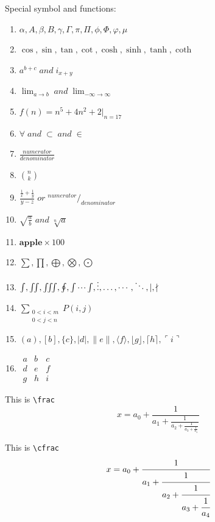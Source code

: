 \documentclass[12pt, a4paper, twoside]{report}
\begin{document}
Special symbol and functions:\\
\begin{enumerate}
    \item $\alpha, A, \beta, B, \gamma, \Gamma, \pi, \Pi, \phi, \Phi, \varphi, \mu$
    \item $\cos, \sin, \tan, \cot, \cosh, \sinh, \tanh, \coth$
    \item $a^{b+c} \; and \; i_{x+y} $
    \item $\lim_{a \to b} \; and \; \lim_{-\infty \to \infty}$
    \item $f(n) = n^5 + 4n^2 + 2|_{n=17}$
    \item $\forall \; and \; \subset \; and \; \in $
    \item $\frac{numerator}{denominator}$
    \item $\binom{n}{k}$
    \item $\frac{\frac{1}{x}+\frac{1}{y}}{y-z} \; or \; ^{numerator}/_{denominator}$
    \item $\sqrt{\frac{a}{b}} \;and \; \sqrt[n]{a}$
    \item $ \textbf{apple} \times 100 $
    \item $ \sum, \prod, \bigoplus, \bigotimes, \bigodot $
    \item $ \int, \iint ,\iiint, \oint, \idotsint, \vdots, \ldots, \cdots, \ddots, \mid, \nmid $
    \item $\sum_{
            \substack{
                0<i<m\\
                0<j<n}
                } P(i,j)$
    \item $( a ), [ b ], \{ c \},| d |, \| e \|, \langle f \rangle,
            \lfloor g \rfloor,  \lceil h \rceil , \ulcorner i \urcorner$
    \item $ \begin{matrix}
                a & b & c \\
                d & e & f \\
                g & h & i
            \end{matrix} $

\end{enumerate}

This is \verb|\frac|
\begin{equation}
x = a_0 + \frac{1}{a_1
+ \frac{1}{a_2
+ \frac{1}{a_3 + \frac{1}{a_4} } } }
\end{equation}

This is \verb|\cfrac|
\begin{equation}
x = a_0 + \cfrac{1}{a_1
+ \cfrac{1}{a_2
+ \cfrac{1}{a_3 + \cfrac{1}{a_4} } } }
\end{equation}
\end{document}
